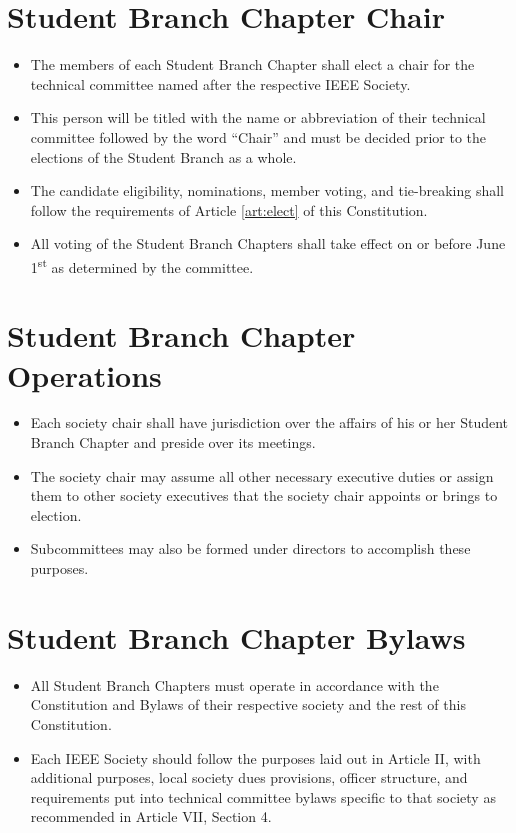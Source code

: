 \documentclass[12pt]{constitution}
\newcommand{\datetermstart}{June 1\textsuperscript{st}} %
\begin{document}
\section{Student Branch Chapter Chair}
\label{sec:sbc_chair}
\begin{itemize}
    \item The members of each Student Branch Chapter shall elect a chair for the technical committee named after the respective IEEE Society.
    \item This person will be titled with the name or abbreviation of their technical committee followed by the word ``Chair'' and must be decided prior to the elections of the Student Branch as a whole.
    \item The candidate eligibility, nominations, member voting, and tie-breaking shall follow the requirements of Article \ref{art:elect} of this Constitution.
    \item All voting of the Student Branch Chapters shall take effect on or before \datetermstart{} as determined by the committee.
\end{itemize}

\section{Student Branch Chapter Operations}
\label{sec:sbc_operate}
\begin{itemize}
    \item Each society chair shall have jurisdiction over the affairs of his or her Student Branch Chapter and preside over its meetings.
    \item The society chair may assume all other necessary executive duties or assign them to other society executives that the society chair appoints or brings to election.
    \item Subcommittees may also be formed under directors to accomplish these purposes.
\end{itemize}

\section{Student Branch Chapter Bylaws}
\label{sec:sbc_bylaw}
\begin{itemize}
    \item All Student Branch Chapters must operate in accordance with the Constitution and Bylaws of their respective society and the rest of this Constitution.
    \item 	Each IEEE Society should follow the purposes laid out in Article II, with additional purposes, local society dues provisions, officer structure, and requirements put into technical committee bylaws specific to that society as recommended in Article VII, Section 4.
\end{itemize}
\end{document}
